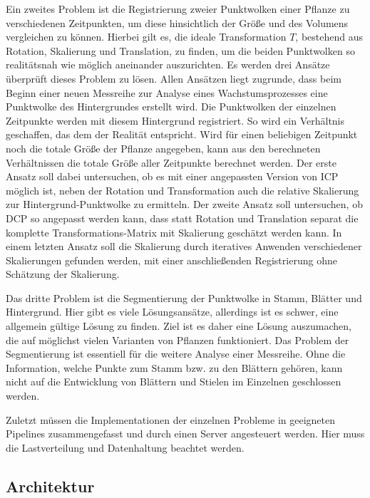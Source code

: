 \documentclass[12pt,titlepage, twoside]{article}
\begin{document}
Ein zweites Problem ist die Registrierung zweier Punktwolken einer Pflanze zu verschiedenen Zeitpunkten, um diese hinsichtlich der Größe und des Volumens vergleichen zu können. 
Hierbei gilt es, die ideale Transformation $T$, bestehend aus Rotation, Skalierung und Translation, zu finden, um die beiden Punktwolken so realitätsnah wie möglich aneinander auszurichten.
Es werden drei Ansätze überprüft dieses Problem zu lösen. 
Allen Ansätzen liegt zugrunde, dass beim Beginn einer neuen Messreihe zur Analyse eines Wachstumsprozesses eine Punktwolke des Hintergrundes erstellt wird.
Die Punktwolken der einzelnen Zeitpunkte werden mit diesem Hintergrund registriert. So wird ein Verhältnis geschaffen, das dem der Realität entspricht. 
Wird für einen beliebigen Zeitpunkt noch die totale Größe der Pflanze angegeben, kann aus den berechneten Verhältnissen die totale Größe aller Zeitpunkte berechnet werden. 
Der erste Ansatz soll dabei untersuchen, ob es mit einer angepassten Version von ICP möglich ist, neben der Rotation und Transformation auch die relative Skalierung zur Hintergrund-Punktwolke zu ermitteln.
Der zweite Ansatz soll untersuchen, ob DCP so angepasst werden kann, dass statt Rotation und Translation separat die komplette Transformations-Matrix mit Skalierung geschätzt werden kann.
In einem letzten Ansatz soll die Skalierung durch iteratives Anwenden verschiedener Skalierungen gefunden werden, mit einer anschließenden Registrierung ohne Schätzung der Skalierung.

Das dritte Problem ist die Segmentierung der Punktwolke in Stamm, Blätter und Hintergrund. 
Hier gibt es viele Lösungsansätze, allerdings ist es schwer, eine allgemein gültige Lösung zu finden. 
Ziel ist es daher eine Lösung auszumachen, die auf möglichst vielen Varianten von Pflanzen funktioniert. 
Das Problem der Segmentierung ist essentiell für die weitere Analyse einer Messreihe. 
Ohne die Information, welche Punkte zum Stamm bzw. zu den Blättern gehören, kann nicht auf die Entwicklung von Blättern und Stielen im Einzelnen geschlossen werden.

Zuletzt müssen die Implementationen der einzelnen Probleme in geeigneten Pipelines zusammengefasst und durch einen Server angesteuert werden. 
Hier muss die Lastverteilung und Datenhaltung beachtet werden.

\subsection{Architektur}
\label{sec:realisierung:architektur}
\end{document}

